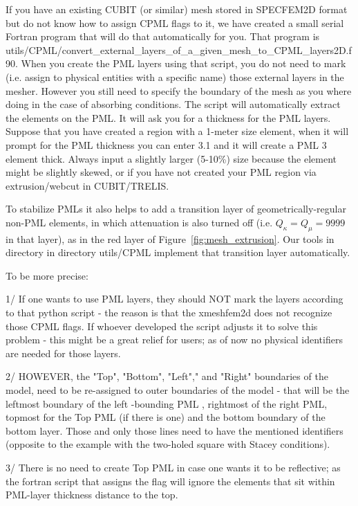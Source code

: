 If you have an existing CUBIT (or similar) mesh stored in SPECFEM2D
format but do not know how to assign CPML flags to it,
we have created a small serial Fortran program that will do that automatically for you.
That program is utils/CPML/convert\_external\_layers\_of\_a\_given\_mesh\_to\_CPML\_layers2D.f90.
When you create the PML layers using that script, you do not need to mark
(i.e. assign to physical entities with a specific name) those external layers in the mesher.
However you still need to specify the boundary of the mesh as you where doing in the case of absorbing conditions.
The script will automatically extract the elements on the PML. It will ask you for a thickness for the PML layers.
Suppose that you have created a region with a 1-meter size element, when it will prompt for the PML thickness
you can enter 3.1 and it will create a PML 3 element thick. Always input a slightly larger (5-10\%) size because the element might be slightly skewed,
or if you have not created your PML region via extrusion/webcut in CUBIT/TRELIS.

To stabilize PMLs it also helps to add a transition layer of geometrically-regular non-PML elements, in which attenuation is also
turned off (i.e. $Q_\kappa = Q_\mu = 9999$ in that layer), as in the red layer of Figure~\ref{fig:mesh_extrusion}.
Our tools in directory in directory utils/CPML  implement that transition layer automatically.

To be more precise:

1/ If one wants to use PML layers, they should NOT mark the layers according to that python script - the reason is that the xmeshfem2d does not recognize those CPML flags. If whoever developed the script adjusts it to solve this problem - this might be a great relief for users; as of now no physical identifiers are needed for those layers.

2/ HOWEVER, the "Top", "Bottom", "Left"," and "Right" boundaries of the model, need to be re-assigned to outer boundaries of the model - that will be the leftmost boundary of the left -bounding PML , rightmost of the right PML, topmost for the Top PML (if there is one) and the bottom boundary of the bottom layer. Those and only those lines need to have the mentioned identifiers (opposite to the example with the two-holed square with Stacey conditions).

3/ There is no need to create Top PML in case one wants it to be reflective; as the fortran script that assigns the flag will ignore the elements that sit within  PML-layer thickness distance to the top.


